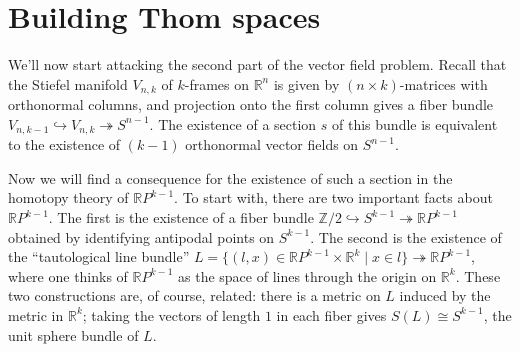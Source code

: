 \documentclass{article}
\newcommand{\Z}{\mathbb{Z}}
\newcommand{\R}{\mathbb{R}}
\newcommand{\RP}{\R P}
\newcommand{\into}{\hookrightarrow}
\newcommand{\onto}{\twoheadrightarrow}
\begin{document}

\section{Building Thom spaces} %

We'll now start attacking the second part of the vector field problem.  Recall that the Stiefel manifold $V_{n, k}$ of $k$-frames on $\R^n$ is given by $(n \times k)$-matrices with orthonormal columns, and projection onto the first column gives a fiber bundle $V_{n, k-1} \into V_{n, k} \onto S^{n-1}$.  The existence of a section $s$ of this bundle is equivalent to the existence of $(k-1)$ orthonormal vector fields on $S^{n-1}$.

Now we will find a consequence for the existence of such a section in the homotopy theory of $\RP^{k-1}$.  To start with, there are two important facts about $\RP^{k-1}$.  The first is the existence of a fiber bundle $\Z/2 \into S^{k-1} \onto \RP^{k-1}$ obtained by identifying antipodal points on $S^{k-1}$.  The second is the existence of the ``tautological line bundle'' $L = \{(l, x) \in \RP^{k-1} \times \R^k \mid x \in l\} \onto \RP^{k-1}$, where one thinks of $\RP^{k-1}$ as the space of lines through the origin on $\R^k$.  These two constructions are, of course, related: there is a metric on $L$ induced by the metric in $\R^k$; taking the vectors of length $1$ in each fiber gives $S(L) \cong S^{k-1}$, the unit sphere bundle of $L$.
\end{document}
